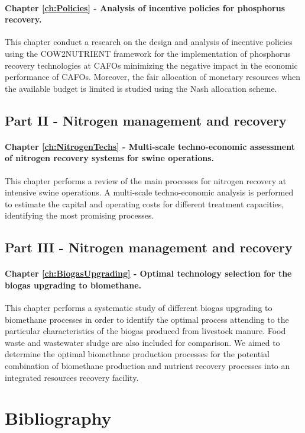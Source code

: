 \begin{refsection}[referencesCh1]
\paragraph{Chapter \ref{ch:Policies} - Analysis of incentive policies for phosphorus recovery.} This chapter conduct a research on the design and analysis of incentive policies using the COW2NUTRIENT framework for the implementation of phosphorus recovery technologies at CAFOs minimizing the negative impact in the economic performance of CAFOs. Moreover, the fair allocation of monetary resources when the available budget is limited is studied using the Nash allocation scheme.

\subsection{Part II - Nitrogen management and recovery}
\paragraph{Chapter \ref{ch:NitrogenTechs} - Multi-scale techno-economic assessment of nitrogen recovery systems for swine operations.} This chapter performs a review of the main processes for nitrogen recovery at intensive swine operations. A multi-scale techno-economic analysis is performed to estimate the capital and operating costs for different treatment capacities, identifying the most promising processes.

\subsection{Part III - Nitrogen management and recovery}
\paragraph{Chapter \ref{ch:BiogasUpgrading} - Optimal technology selection for the biogas upgrading to biomethane.} This chapter performs a systematic study of different biogas upgrading to biomethane processes in order to identify the optimal process attending to the particular characteristics of the biogas produced from livestock manure. Food waste and wastewater sludge are also included for comparison. We aimed to determine the optimal biomethane production processes for the potential combination of biomethane production and nutrient recovery processes into an integrated resources recovery facility.

\section*{Bibliography}
\printbibliography[heading=none]
\end{refsection}